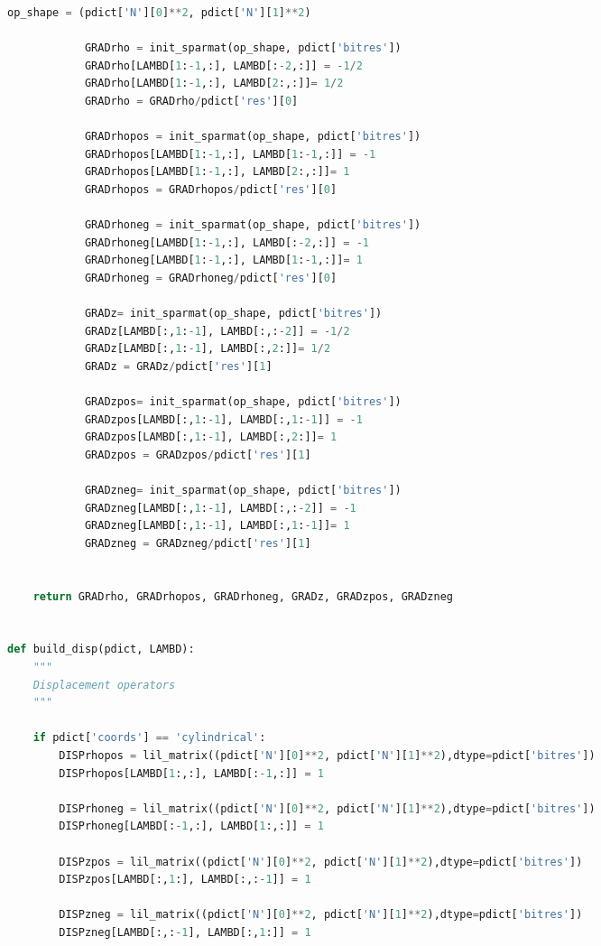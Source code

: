 \begin{spacing}{1}
\begin{lstlisting}[frame=single, language=Python]
            op_shape = (pdict['N'][0]**2, pdict['N'][1]**2)
            
            GRADrho = init_sparmat(op_shape, pdict['bitres'])
            GRADrho[LAMBD[1:-1,:], LAMBD[:-2,:]] = -1/2
            GRADrho[LAMBD[1:-1,:], LAMBD[2:,:]]= 1/2
            GRADrho = GRADrho/pdict['res'][0]

            GRADrhopos = init_sparmat(op_shape, pdict['bitres'])
            GRADrhopos[LAMBD[1:-1,:], LAMBD[1:-1,:]] = -1
            GRADrhopos[LAMBD[1:-1,:], LAMBD[2:,:]]= 1
            GRADrhopos = GRADrhopos/pdict['res'][0]

            GRADrhoneg = init_sparmat(op_shape, pdict['bitres'])
            GRADrhoneg[LAMBD[1:-1,:], LAMBD[:-2,:]] = -1
            GRADrhoneg[LAMBD[1:-1,:], LAMBD[1:-1,:]]= 1
            GRADrhoneg = GRADrhoneg/pdict['res'][0]

            GRADz= init_sparmat(op_shape, pdict['bitres'])
            GRADz[LAMBD[:,1:-1], LAMBD[:,:-2]] = -1/2
            GRADz[LAMBD[:,1:-1], LAMBD[:,2:]]= 1/2
            GRADz = GRADz/pdict['res'][1]

            GRADzpos= init_sparmat(op_shape, pdict['bitres'])
            GRADzpos[LAMBD[:,1:-1], LAMBD[:,1:-1]] = -1
            GRADzpos[LAMBD[:,1:-1], LAMBD[:,2:]]= 1
            GRADzpos = GRADzpos/pdict['res'][1]

            GRADzneg= init_sparmat(op_shape, pdict['bitres'])
            GRADzneg[LAMBD[:,1:-1], LAMBD[:,:-2]] = -1
            GRADzneg[LAMBD[:,1:-1], LAMBD[:,1:-1]]= 1
            GRADzneg = GRADzneg/pdict['res'][1]
        
        
    return GRADrho, GRADrhopos, GRADrhoneg, GRADz, GRADzpos, GRADzneg


def build_disp(pdict, LAMBD):
    """
    Displacement operators
    """
    
    if pdict['coords'] == 'cylindrical':
        DISPrhopos = lil_matrix((pdict['N'][0]**2, pdict['N'][1]**2),dtype=pdict['bitres'])
        DISPrhopos[LAMBD[1:,:], LAMBD[:-1,:]] = 1

        DISPrhoneg = lil_matrix((pdict['N'][0]**2, pdict['N'][1]**2),dtype=pdict['bitres'])
        DISPrhoneg[LAMBD[:-1,:], LAMBD[1:,:]] = 1

        DISPzpos = lil_matrix((pdict['N'][0]**2, pdict['N'][1]**2),dtype=pdict['bitres'])
        DISPzpos[LAMBD[:,1:], LAMBD[:,:-1]] = 1

        DISPzneg = lil_matrix((pdict['N'][0]**2, pdict['N'][1]**2),dtype=pdict['bitres'])
        DISPzneg[LAMBD[:,:-1], LAMBD[:,1:]] = 1
        

\end{lstlisting}
\end{spacing}
